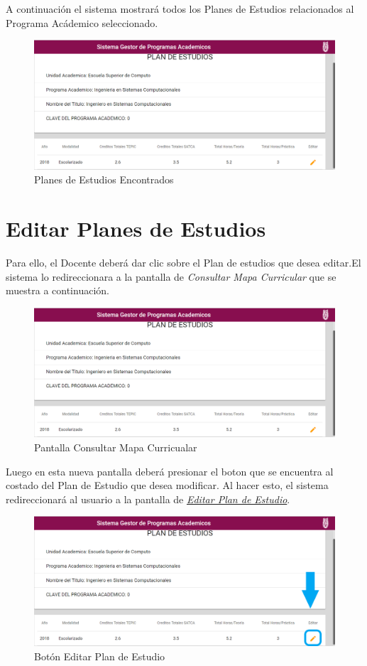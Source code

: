 A continuación el sistema mostrará todos los Planes de Estudios relacionados al Programa Acádemico seleccionado.
\begin{figure}[!hbtp]
	\centering
	\hypertarget{planes}{\includegraphics[width=0.7\linewidth]{images/SP4-GPE/planes}}
	\caption{Planes de Estudios Encontrados}
	\label{planes}
\end{figure}
\newpage
\section{Editar Planes de Estudios}

Para ello, el Docente deberá dar clic sobre el Plan de estudios que desea editar.El sistema lo redireccionara a la pantalla de \textit{Consultar Mapa Curricular} que se muestra a continuación.

\begin{figure}[!hbtp]
    \centering
    \hypertarget{consultarMC}{\includegraphics[width=0.7\linewidth]{images/SP4-GPE/consultarMC}}
    \caption{Pantalla Consultar Mapa Curricualar}
    \label{consultarMC}
\end{figure}
Luego en esta nueva pantalla deberá presionar el boton  que se encuentra al costado del Plan de Estudio que desea modificar. Al hacer esto, el sistema redireccionará al usuario a la pantalla de \hyperlink{editarPE}{\textit{Editar Plan de Estudio}}.

\begin{figure}[!hbtp]
	\centering
	\hypertarget{editar}{\includegraphics[width=0.7\linewidth]{images/SP4-GPE/editarC}}
	\caption{Botón Editar Plan de Estudio}
	\label{editar}
\end{figure}
\newpage

